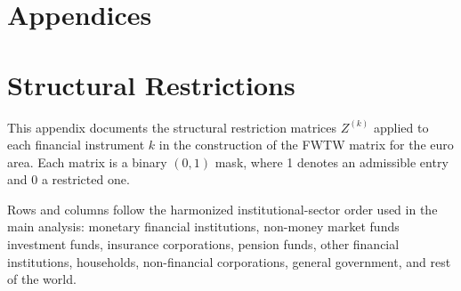 \cleardoublepage
{}


\chapter*{Appendices}
\chapter{Structural Restrictions}
\label{Appendix A: Structural Restrictions}


This appendix documents the structural restriction matrices $Z^{(k)}$ applied to each
financial instrument $k$ in the construction of the FWTW matrix for the euro area.
Each matrix is a binary $(0,1)$ mask, where 1 denotes an admissible entry and 0 a
restricted one.

Rows and columns follow the harmonized institutional-sector order used in the
main analysis: monetary financial institutions, non-money market funds investment funds, insurance corporations, pension funds, other
financial institutions, households, non-financial corporations, general
government, and rest of the world.

\begingroup
\footnotesize
\setlength{\arraycolsep}{2.4pt}
\renewcommand{\arraystretch}{0.85}

\newcommand{\zmat}[2]{%
\begin{minipage}[t]{0.32\textwidth}
\centering
\textbf{\footnotesize #1}\\[2pt]
\resizebox{0.82\linewidth}{!}{$
\begin{bmatrix}
#2
\end{bmatrix}$}
\end{minipage}
}

